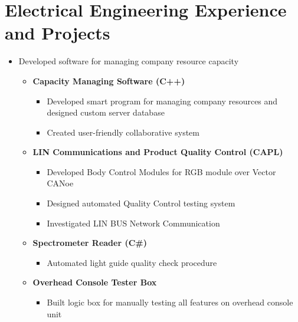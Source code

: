 \documentclass[11pt,a4paper,sans]{moderncv}        %
\begin{document}
\section{Electrical Engineering Experience and Projects}
{}{
\begin{itemize}
\item Developed software for managing company resource capacity
    \begin{itemize}
  \item \textbf{Capacity Managing Software (C++)}
  \begin{itemize}
  \item  Developed smart program for managing company resources and designed custom server database
  \item Created user-friendly collaborative system
\end{itemize}
\item \textbf{LIN Communications and Product Quality Control (CAPL)}
\begin{itemize}
  \item Developed Body Control Modules for RGB module over Vector CANoe
  \item Designed automated Quality Control testing system
  \item Investigated LIN BUS Network Communication
\end{itemize}
\item \textbf{Spectrometer Reader (C\#)}
\begin{itemize}
  \item Automated light guide quality check procedure
\end{itemize}
\item \textbf{Overhead Console Tester Box}
\begin{itemize}
  \item Built logic box for manually testing all features on overhead console unit
\end{itemize}
\end{itemize}
\end{itemize}
}
\end{document}
